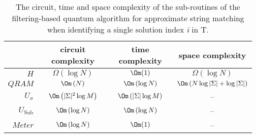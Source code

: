 \begin{table}[h!]
	\centering
	\begin{tabular}{ | r || c | c | c |}
		\hline
		\quad                              & circuit complexity                                                  & time complexity                                                 & space complexity\\
		\hline\hline
		$H$                                & $\Omega\left(\log N\right)$                              & $\Om(1)$                                                         & $\Omega\left(\log N\right)$\\
		\hline
		$QRAM$                          & $\Om\left( N \right)$                                            & $\Om\left( \log N \right)$                             & $\Om\left( N\log \vert \Sigma \vert + \log\vert \Sigma \vert \right)$\\
		\hline
		$U_{\mathrm{\sigma}}$  & $\Om\left(\vert \Sigma \vert^2\log M \right)$  & $\Om\left( \vert \Sigma \vert\log M \right)$  & --\\
		\hline
		$U_{\mathrm{Sub}}$      & $\Om\left( \log N \right)$                                 & $\Om\left( \log N \right)$                              & --\\
		\hline
		$Meter$                         & $\Om\left(\log N\right)$                                   & $\Om(1)$                                                          & --\\
		\hline
	\end{tabular}
	\caption{The circuit, time and space complexity of the sub-routines of the filtering-based quantum algorithm for approximate string matching when identifying a single solution index \textit{i} in T.}
	\label{tab:quantum-filtering-verification-complexity}
\end{table}

